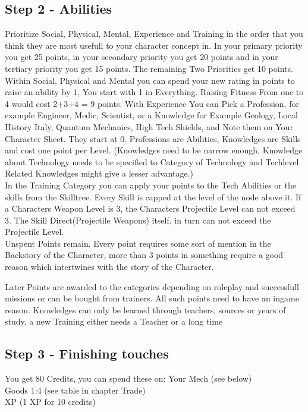 \documentclass{article}
\begin{document}
    \subsection{Step 2 - Abilities}
    Prioritize Social, Physical, Mental, Experience and Training in the order that you think they are most
    usefull to your character concept in. \newline
    In your primary priority you get 25 points, in your secondary priority you get 20 points and in your tertiary
    priority you get 15 points. The remaining Two Priorities get 10 points.\newline
    Within Social, Physical and Mental you can spend your new rating in points to raise an ability by 1, You start with 1
    in Everything. Raising Fitness From one to 4 would cost 2+3+4 = 9 points.\newline
    With Experience You can Pick a Profession, for example Engineer, Medic, Scientist, or a Knowledge for Example
    Geology, Local History Italy, Quantum Mechanics, High Tech Shields, and Note them on Your Character Sheet. They start at
    0. Professions are Abilities, Knowledges are Skills and cost one point per Level. (Knowledges need to be narrow enough,
    Knowledge about Technology needs to be specified to Category of Technology and Techlevel. Related Knowledges might give
    a lesser advantage.)\\

    In the Training Category you can apply your points to the Tech Abilities or the skills from the Skilltree.
    Every Skill is capped at the level of the node above it. If a Characters Weapon Level is 3, the Characters Projectile
    Level can not exceed 3. The Skill Direct(Projectile Weapons) itself, in turn can not exceed the Projectile Level.\\


    Unspent Points remain. Every point requires some sort of mention in the Backstory of the Character, more than 3 points
    in something require a good reason which intertwines with the story of the Character.

    Later Points are awarded to the categories depending on roleplay and successfull missions or can be bought from
    trainers. All such points need to have an ingame reason. Knowledges can only be learned through teachers, sources or
    years of study, a new Training either needs a Teacher or a long time\\


    \subsection{Step 3 - Finishing touches}
    You get 80 Credits, you can spend these on:
    Your Mech (see below)\\
    Goods 1:4 (see table in chapter Trade)\\
    XP (1 XP for 10 credits)\\
\end{document}
